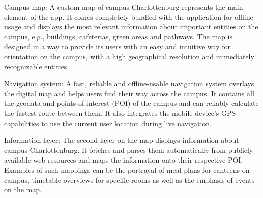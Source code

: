 Campus map: A custom map of campus Charlottenburg represents the main element of the app. It comes completely bundled with the application for offline usage and displays the most relevant information about important entities on the campus, e.g., buildings, cafeterias, green areas and pathways. The map is designed in a way to provide its users with an easy and intuitive way for orientation on the campus, with a high geographical resolution and immediately recognizable entities.

Navigation system: A fast, reliable and offline-usable navigation system overlays the digital map and helps users find their way across the campus. It contains all the geodata and points of interest (POI) of the campus and can reliably calculate the fastest route between them. It also integrates the mobile device's GPS capabilities to use the current user location during live navigation.

Information layer: The second layer on the map displays information about campus Charlottenburg. It fetches and parses them automatically from publicly available web resources and maps the information onto their respective POI. Examples of such mappings can be the portrayal of meal plans for canteens on campus, timetable overviews for specific rooms as well as the emphasis of events on the map.